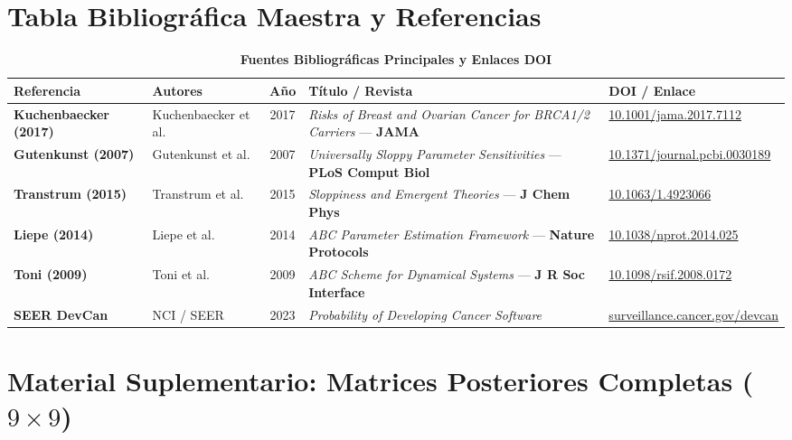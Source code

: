 \documentclass[10pt,a4paper]{article}
\begin{document}
\section{Tabla Bibliográfica Maestra y Referencias}

\begin{table}[h!]
\centering
\small
\caption{\textbf{Fuentes Bibliográficas Principales y Enlaces DOI}}
\begin{tabularx}{\textwidth}{llcXl}
\toprule
\textbf{Referencia} & \textbf{Autores} & \textbf{Año} & \textbf{Título / Revista} & \textbf{DOI / Enlace} \\
\midrule
\textbf{Kuchenbaecker (2017)} & Kuchenbaecker et al. & 2017 & \textit{Risks of Breast and Ovarian Cancer for BRCA1/2 Carriers} --- \textbf{JAMA} & \href{https://doi.org/10.1001/jama.2017.7112}{10.1001/jama.2017.7112} \\
\textbf{Gutenkunst (2007)} & Gutenkunst et al. & 2007 & \textit{Universally Sloppy Parameter Sensitivities} --- \textbf{PLoS Comput Biol} & \href{https://doi.org/10.1371/journal.pcbi.0030189}{10.1371/journal.pcbi.0030189} \\
\textbf{Transtrum (2015)} & Transtrum et al. & 2015 & \textit{Sloppiness and Emergent Theories} --- \textbf{J Chem Phys} & \href{https://doi.org/10.1063/1.4923066}{10.1063/1.4923066} \\
\textbf{Liepe (2014)} & Liepe et al. & 2014 & \textit{ABC Parameter Estimation Framework} --- \textbf{Nature Protocols} & \href{https://doi.org/10.1038/nprot.2014.025}{10.1038/nprot.2014.025} \\
\textbf{Toni (2009)} & Toni et al. & 2009 & \textit{ABC Scheme for Dynamical Systems} --- \textbf{J R Soc Interface} & \href{https://doi.org/10.1098/rsif.2008.0172}{10.1098/rsif.2008.0172} \\
\textbf{SEER DevCan} & NCI / SEER & 2023 & \textit{Probability of Developing Cancer Software} & \href{https://surveillance.cancer.gov/devcan/}{surveillance.cancer.gov/devcan} \\
\bottomrule
\end{tabularx}
\label{tab:bibliografia}
\end{table}

\newpage
\section{Material Suplementario: Matrices Posteriores Completas (\texorpdfstring{$9 \times 9$}{9x9})}
\end{document}
